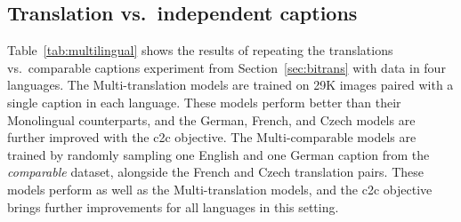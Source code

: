 


\subsection{Translation vs.\ independent captions}
\label{sec:multitrans}


Table~\ref{tab:multilingual} shows the results of repeating the translations vs.\ comparable captions experiment from Section~\ref{sec:bitrans} with data in four languages. The Multi-translation models are trained on 29K images paired with a single caption in each language. These models perform better than their Monolingual counterparts, and the German, French, and Czech models are further improved  with the c2c objective. The Multi-comparable models are trained by randomly sampling one English and one German caption from the {\it comparable} dataset, alongside the French and Czech translation pairs. These models perform as well as the Multi-translation models, and the c2c objective brings further improvements for all languages in this setting.

